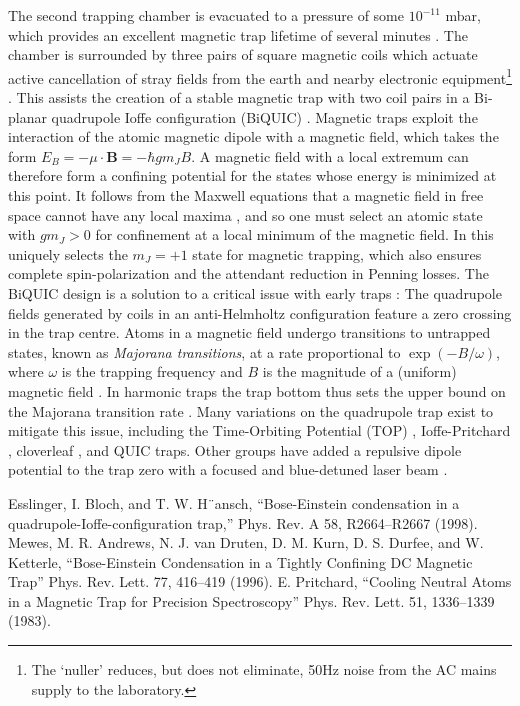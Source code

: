 	The second trapping chamber is evacuated to a pressure of some $10^{-11}$ mbar, which provides an excellent magnetic trap lifetime of several minutes .
	The chamber is surrounded by three pairs of square magnetic coils which actuate active cancellation of stray fields from the earth and nearby electronic equipment\footnote{The `nuller' reduces, but does not eliminate, 50Hz noise from the AC mains supply to the laboratory.} \cite{dedman07}.
	This assists the creation of a stable magnetic trap with two coil pairs in a Bi-planar quadrupole Ioffe configuration (BiQUIC) \cite{dall07}.
	Magnetic traps exploit the interaction of the atomic magnetic dipole with a magnetic field, which takes the form $E_B = -\mu\cdot \textbf{B} = -\hbar g m_J B$.
	A magnetic field with a local extremum can therefore form a confining potential for the states whose energy is minimized at this point.
	It follows from the Maxwell equations that a magnetic field in free space cannot have any local maxima \cite{MakingProbingUnderstanding}, and so one must select an atomic state with $g m_J>0$ for confinement at a local minimum of the magnetic field.
	In \mhe this uniquely selects the $m_J=+1$ state for magnetic trapping, which also ensures complete spin-polarization and the attendant reduction in Penning losses.
	The BiQUIC design is a solution to a critical issue with early traps \cite{migdall85}: The quadrupole fields generated by coils in an anti-Helmholtz configuration feature a zero crossing in the trap centre.
	Atoms in a magnetic field undergo transitions to untrapped states, known as \emph{Majorana transitions}, at a rate proportional to $\exp(-B/\omega)$, where $\omega$ is the trapping frequency and $B$ is the magnitude of a (uniform) magnetic field \cite{sukumar97}.
	In harmonic traps the trap bottom thus sets the upper bound on the Majorana transition rate \cite{brink06}.
	Many variations on the quadrupole trap exist to mitigate this issue, including the Time-Orbiting Potential (TOP) \cite{petrich95}, Ioffe-Pritchard \cite{pritchard83}, cloverleaf \cite{mewes97}, and QUIC \cite{esslinger98} traps.
	Other groups have added a repulsive dipole potential to the trap zero with a focused and blue-detuned laser beam \cite{papers}.
	
	Esslinger, I.
	Bloch, and T.
	W.
	H¨ansch, ``Bose-Einstein condensation in a quadrupole-Ioffe-configuration trap,'' Phys.
	Rev.
	A 58, R2664–R2667 (1998).
	Mewes, M.
	R.
	Andrews, N.
	J.
	van Druten, D.
	M.
	Kurn, D.
	S.
	Durfee, and W.
	Ketterle, ``Bose-Einstein Condensation in a Tightly Confining DC Magnetic Trap'' Phys.
	Rev.
	Lett.
	77, 416–419 (1996).
	E.
	Pritchard, ``Cooling Neutral Atoms in a Magnetic Trap for Precision Spectroscopy'' Phys.
	Rev.
	Lett.
	51, 1336–1339 (1983).

